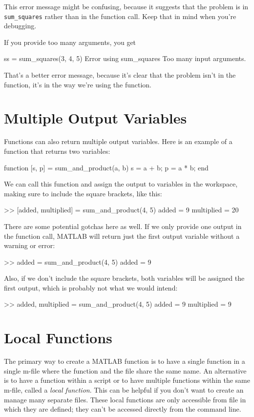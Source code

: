 \documentclass[../../book.tex]{subfiles}
\begin{document}
This error message might be confusing, because it suggests that
the problem is in \lstinline{sum_squares} rather than in the function call.
Keep that in mind when you're debugging.

If you provide too many arguments, you get

\begin{code}
ss = sum_squares(3, 4, 5)
Error using sum_squares
Too many input arguments.
\end{code}

That's a better error message, because it's clear that the problem isn't in the function, it's in the way we're using the function.

\section{Multiple Output Variables}

Functions can also return multiple output variables.  Here is an example of a function that returns two variables:
\begin{code}
function [s, p] = sum_and_product(a, b)
    s = a + b;
    p = a * b;
end
\end{code}

We can call this function and assign the output to variables in the workspace, making sure to include the square brackets, like this:
\begin{code}
    >> [added, multiplied] = sum_and_product(4, 5)
    added =
         9
    multiplied =
        20
\end{code}

There are some potential gotchas here as well.  If we only provide one output in the function call, MATLAB will return just the first output variable without a warning or error:
\begin{code}
    >> added = sum_and_product(4, 5)
    added =
         9    
\end{code}
Also, if we don't include the square brackets, both variables will be assigned the first output, which is probably not what we would intend:
\begin{code}
    >> added, multiplied = sum_and_product(4, 5)
    added =
         9
    multiplied =
         9
\end{code}

\section{Local Functions}
The primary way to create a MATLAB function is to have a single function in a single m-file where the function and the file share the same name.  An alternative is to have a function within a script or to have multiple functions within the same m-file, called a \emph{local function}.   This can be helpful if you don't want to create an manage many separate files. These local functions are only accessible from file in which they are defined; they can't be accessed directly from the command line.
\end{document}
